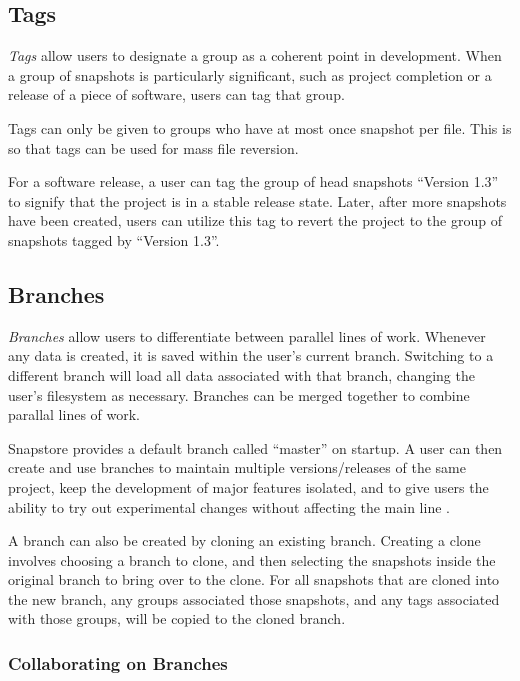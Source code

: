 \subsection{Tags}

\textit{Tags} allow users to designate a group as a coherent point in development. When a group of snapshots is particularly significant, such as project completion or a release of a piece of software, users can tag that group.

Tags can only be given to groups who have at most once snapshot per file. This is so that tags can be used for mass file reversion.

For a software release, a user can tag the group of head snapshots ``Version 1.3'' to signify that the project is in a stable release state. Later, after more snapshots have been created, users can utilize this tag to revert the project to the group of snapshots tagged by ``Version 1.3''.

\subsection{Branches}

\textit{Branches} allow users to differentiate between parallel lines of work. Whenever any data is created, it is saved within the user's current branch. Switching to a different branch will load all data associated with that branch, changing the user's filesystem as necessary. Branches can be merged together to combine parallal lines of work.

Snapstore provides a default branch called ``master'' on startup. A user can then create and use branches to maintain multiple versions/releases of the same project, keep the development of major features isolated, and to give users the ability to try out experimental changes without affecting the main line \cite{RossoJackson}.

A branch can also be created by cloning an existing branch. Creating a clone involves choosing a branch to clone, and then selecting the snapshots inside the original branch to bring over to the clone. For all snapshots that are cloned into the new branch, any groups associated those snapshots, and any tags associated with those groups, will be copied to the cloned branch.

\subsubsection{Collaborating on Branches}

